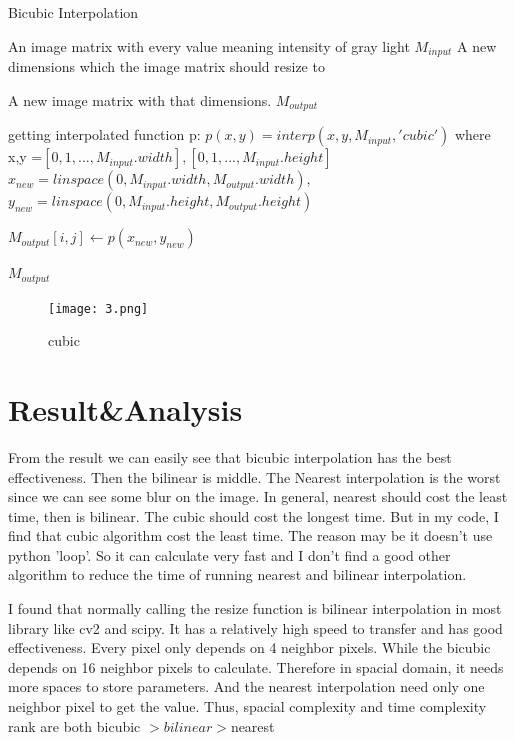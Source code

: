 \documentclass{article}
\begin{document}
\begin{algorithm}[h]
  \caption{Bicubic Interpolation}
  \begin{algorithmic}[1]
  \Require
      An image matrix with every value meaning intensity of gray light $M_{input}$
      A new dimensions which the image matrix should resize to 
      
    \Ensure
      A new image matrix with that dimensions. $M_{output}$

      \State getting interpolated function p: $p(x,y)=interp(x,y,M_{input},'cubic')$ 
      \State where x,y =$[0,1,...,M_{input}.width],[0,1,...,M_{input}.height]$ 
      \State $x_{new}=linspace(0,M_{input}.width,M_{output}.width),$
      \State $y_{new}=linspace(0,M_{input}.height,M_{output}.height)$
     
      \State $M_{output}[i,j] \gets p(x_{new},y_{new})$
      
      

      \EndFor
      \EndFor
   
   \Return $M_{output}$
    \label{code:recentEnd}
  \end{algorithmic}
\end{algorithm}

\begin{figure}[h]
    \centering
    \texttt{[image: 3.png]}
    \caption{cubic}
    \label{fig:enter-label}
\end{figure}
\FloatBarrier
\section*{Result\&Analysis}
From the result we can easily see that bicubic interpolation has the best effectiveness. Then the bilinear is middle. The Nearest interpolation is the worst since we can see some blur on the image. In general, nearest should cost the least time, then is bilinear. The cubic should cost the longest time. But in my code, I find that cubic algorithm cost the least time. The reason may be it doesn't use python 'loop'. So it can calculate very fast and I don't find a good other algorithm to reduce the time of running nearest and bilinear interpolation. 

I found that normally calling the resize function is bilinear interpolation in most library like cv2 and scipy. It has a relatively high speed to transfer and has good effectiveness. Every pixel only depends on 4 neighbor pixels. While the bicubic depends on 16 neighbor pixels to calculate. Therefore in spacial domain, it needs more spaces to store parameters. And the nearest interpolation need only one neighbor pixel to get the value. Thus, spacial complexity and time complexity rank are both bicubic $> bilinear > $nearest
\end{document}
